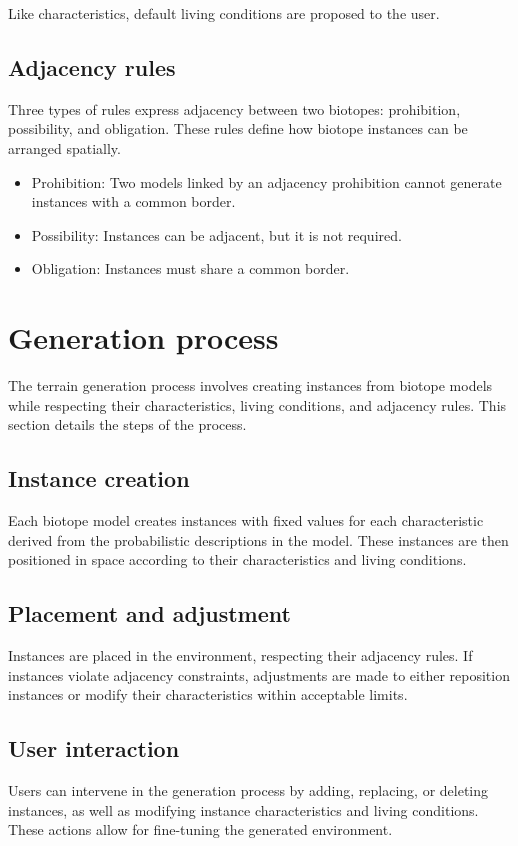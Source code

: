 Like characteristics, default living conditions are proposed to the user.

\subsection{Adjacency rules}
Three types of rules express adjacency between two biotopes: prohibition, possibility, and obligation. These rules define how biotope instances can be arranged spatially.

\begin{itemize}
	\item Prohibition: Two models linked by an adjacency prohibition cannot generate instances with a common border.
	\item Possibility: Instances can be adjacent, but it is not required.
	\item Obligation: Instances must share a common border.
\end{itemize}

\section{Generation process}
\label{sec:influence-on-env-objects_generation-process}
The terrain generation process involves creating instances from biotope models while respecting their characteristics, living conditions, and adjacency rules. This section details the steps of the process.

\subsection{Instance creation}
Each biotope model creates instances with fixed values for each characteristic derived from the probabilistic descriptions in the model. These instances are then positioned in space according to their characteristics and living conditions.

\subsection{Placement and adjustment}
Instances are placed in the environment, respecting their adjacency rules. If instances violate adjacency constraints, adjustments are made to either reposition instances or modify their characteristics within acceptable limits.

\subsection{User interaction}
Users can intervene in the generation process by adding, replacing, or deleting instances, as well as modifying instance characteristics and living conditions. These actions allow for fine-tuning the generated environment.


